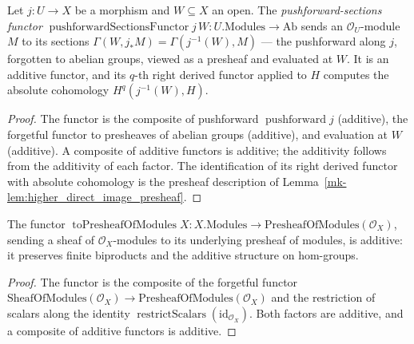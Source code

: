 \begin{lemma}
  \label{mk-lem:pushforward_sections_functor}

  Let \(j : U \to X\) be a morphism and \(W \subseteq X\) an open. The
  \emph{pushforward-sections functor} \(\operatorname{pushforwardSectionsFunctor} j\,W :
  U.\mathrm{Modules} \to \mathrm{Ab}\) sends an \(\mathcal{O}_U\)-module \(M\) to its sections
  \(\Gamma(W, j_* M) = \Gamma(j^{-1}(W), M)\) --- the pushforward along \(j\), forgotten to
  abelian groups, viewed as a presheaf and evaluated at \(W\). It is an additive functor, and
  its \(q\)-th right derived functor applied to \(H\) computes the absolute cohomology
  \(H^q(j^{-1}(W), H)\).
\end{lemma}
\begin{proof}
  The functor is the composite of pushforward \(\operatorname{pushforward} j\) (additive), the
  forgetful functor to presheaves of abelian groups (additive), and evaluation at \(W\)
  (additive). A composite of additive functors is additive; the additivity follows from the additivity of
  each factor. The identification of its right derived functor with
  absolute cohomology is the presheaf description of
  Lemma~\ref{mk-lem:higher_direct_image_presheaf}.
\end{proof}

\begin{lemma}\label{mk-lem:toPresheafOfModules_additive}
  \leanok

  The functor \(\operatorname{toPresheafOfModules} X : X.\mathrm{Modules} \to
  \mathrm{PresheafOfModules}(\mathcal{O}_X)\), sending a sheaf of \(\mathcal{O}_X\)-modules to its
  underlying presheaf of modules, is additive: it preserves finite biproducts and the additive
  structure on hom-groups.
\end{lemma}
\begin{proof}
  \leanok

The functor is the composite of the forgetful functor
  \(\mathrm{SheafOfModules}(\mathcal{O}_X) \to \mathrm{PresheafOfModules}(\mathcal{O}_X)\) and the
  restriction of scalars along the identity \(\operatorname{restrictScalars}(\mathrm{id}_{\mathcal{O}_X})\).
  Both factors are additive, and a composite of additive functors is additive.
\end{proof}

